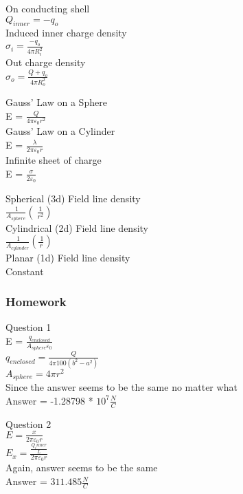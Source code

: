 \documentclass{article}
\begin{document}
\vspace{2mm}

\noindent
On conducting shell\\
$Q_{inner} = -q_o$ \\
Induced inner charge density \\
$\sigma_i = \frac{-q_o}{4 \pi R^{2}_{i}}$ \\
Out charge density \\
$\sigma_o = \frac{Q + q_o}{4 \pi R^{2}_{o}}$

\vspace{2mm}

\noindent
Gauss' Law on a Sphere \\
E = $\frac{Q}{4 \pi \varepsilon_0 r^2}$ \\
Gauss' Law on a Cylinder \\
E = $\frac{\lambda}{2 \pi \varepsilon_0 r}$ \\
Infinite sheet of charge \\
E = $\frac{\sigma}{2 \varepsilon_0}$

\vspace{2mm}

\noindent
Spherical (3d) Field line density \\
$\frac{~1}{A_{sphere}} (~\frac{1}{r^2})$ \\
Cylindrical (2d) Field line density \\
$\frac{~1}{A_{cylinder}} (\frac{~1}{r})$ \\
Planar (1d) Field line density \\
Constant

\subsubsection{Homework}

\noindent 
Question 1 \\
E = $\frac{q_{enclosed}}{A_{sphere} \varepsilon_0}$ \\
$q_{enclosed} = \frac{Q}{4 \pi 100 (b^2 - a ^2)}$ \\
$A_{sphere} = 4 \pi r^2$ \\
Since the answer seems to be the same no matter what \\
Answer =  -1.28798 * $10^7 \frac{N}{C}$

\vspace{2mm}

\noindent
Question 2 \\
$E = \frac{x}{2 \pi \varepsilon_0 r}$ \\
$E_x = \frac{\frac{Q_inner}{L}}{2 \pi \varepsilon_0 r}$ \\
Again, answer seems to be the same \\
Answer = $311.485 \frac{N}{C}$
\end{document}
